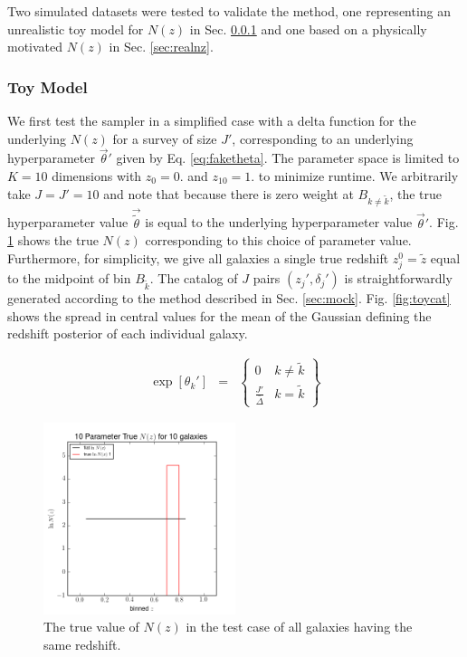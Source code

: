 \documentclass[preprint]{aastex}
\begin{document}
Two simulated datasets were tested to validate the method, one representing an unrealistic toy model for $N(z)$ in Sec. \ref{sec:fake} and one based on a physically motivated $N(z)$ in Sec. \ref{sec:realnz}.%

\subsubsection{Toy Model}
\label{sec:fake}

We first test the sampler in a simplified case with a delta function for the underlying $N(z)$ for a survey of size $J'$, corresponding to an underlying hyperparameter $\vec{\theta}'$ given by Eq. \ref{eq:faketheta}.  The parameter space is limited to $K=10$ dimensions with $z_{0}=0.$ and $z_{10}=1.$ to minimize runtime.  We arbitrarily take $J=J'=10$ and note that because there is zero weight at $B_{k\neq\tilde{k}}$, the true hyperparameter value $\vec{\tilde{\theta}}$ is equal to the underlying hyperparameter value $\vec{\theta}'$.  Fig. \ref{fig:deltatrueNz} shows the true $N(z)$ corresponding to this choice of parameter value.  Furthermore, for simplicity, we give all galaxies a single true redshift $z_{j}^{0}=\tilde{z}$ equal to the midpoint of bin $B_{\tilde{k}}$.  The catalog of $J$ pairs $(z_{j}',\delta_{j}')$ is straightforwardly generated according to the method described in Sec. \ref{sec:mock}.  Fig. \ref{fig:toycat} shows the spread in central values for the mean of the Gaussian defining the redshift posterior of each individual galaxy.

\begin{eqnarray}
\label{eq:faketheta}
\exp[\theta_{k}'] &=& \left\{\begin{array}{cc}0&k\neq\tilde{k}\\ \frac{J'}{\bar{\Delta}}&k=\tilde{k}\end{array}\right\}
\end{eqnarray}

\begin{figure}
\includegraphics[width=0.5\textwidth]{toy/trueNz.png}
\caption{The true value of $N(z)$ in the test case of all galaxies having the same redshift.}
\label{fig:deltatrueNz}
\end{figure}
\end{document}
